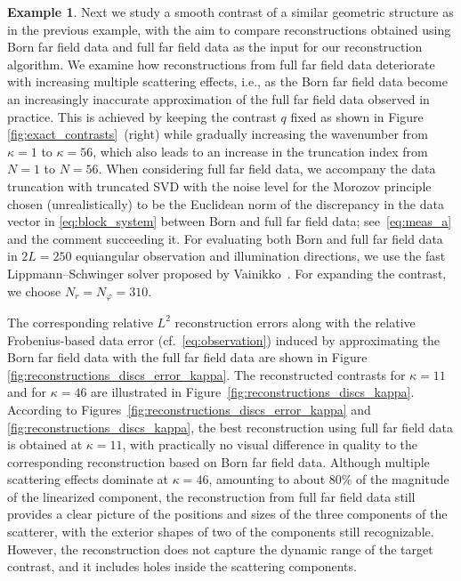 \documentclass[11pt,a4paper]{article}
\theoremstyle{definition}
\newtheorem{example}[theorem]{Example}
\theoremstyle{remark} \newtheorem{remark}[theorem]{Remark}
\numberwithin{equation}{section}
\numberwithin{figure}{section}
\numberwithin{algorithm}{section}
\numberwithin{table}{section}
\begin{document}
\begin{example}
\label{exa:three_discs_smooth}
Next we study a smooth contrast of a similar geometric structure as in the previous example, with the aim to compare reconstructions obtained using Born far field data and full far field data as the input for our reconstruction algorithm. 
We examine how reconstructions from full far field data deteriorate with increasing multiple scattering effects, i.e., as the Born far field data become an increasingly inaccurate approximation of the full far field data observed in practice.
This is achieved by keeping the contrast $q$ fixed as shown in Figure \ref{fig:exact_contrasts}~(right) while gradually increasing the wavenumber from $\kappa=1$ to $\kappa=56$, which also leads to an increase in the truncation index from $N=1$ to $N=56$. When considering full far field data, we accompany the data truncation with truncated SVD with the noise level for the Morozov principle chosen (unrealistically) to be the Euclidean norm of the discrepancy in the data vector in \eqref{eq:block_system} between Born and full far field data; see~\eqref{eq:meas_a} and the comment succeeding it.
For evaluating both Born and full far field data in $2L=250$ equiangular observation and illumination directions, we use the fast Lippmann--Schwinger solver proposed by Vainikko~\cite{Vai97}.
For expanding the contrast, we choose $N_r=N_\varphi=310$. %

The corresponding relative $L^2$ reconstruction errors along with the relative Frobenius-based data error (cf.~\eqref{eq:observation}) induced by approximating the Born far field data with the full far field data are shown in Figure \ref{fig:reconstructions_discs_error_kappa}.
The reconstructed contrasts for $\kappa=11$ and for $\kappa=46$ are illustrated in Figure~\ref{fig:reconstructions_discs_kappa}. According to Figures~\ref{fig:reconstructions_discs_error_kappa} and \ref{fig:reconstructions_discs_kappa}, the best reconstruction using full far field data is obtained at $\kappa = 11$, with practically no visual difference in quality to the corresponding reconstruction based on Born far field data.
Although multiple scattering effects dominate at $\kappa = 46$, amounting to about 80\% of the magnitude of the linearized component, the reconstruction from full far field data still provides a clear picture of the positions and sizes of the three components of the scatterer, with the exterior shapes of two of the components still recognizable. However, the reconstruction does not capture the dynamic range of the target contrast, and it includes holes inside the scattering components.


\end{example}
\end{document}
